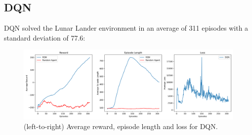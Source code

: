 \documentclass{article}
\begin{document}
\subsection{DQN}
DQN solved the Lunar Lander environment in an average of 311 episodes with a standard deviation of 77.6:
\begin{figure}[H]
  \centering
  \includegraphics[scale=0.35]{3.png}
  \caption{(left-to-right) Average reward, episode length and loss for DQN.}
  \label{dqn}
\end{figure}
\end{document}
